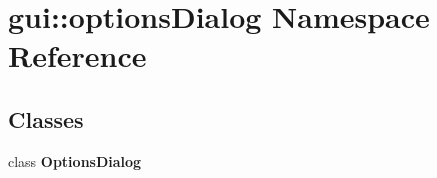 \section{gui::optionsDialog Namespace Reference}
\label{namespacegui_1_1optionsDialog}


\subsection*{Classes}
\begin{CompactItemize}
\item 
class {\bf OptionsDialog}
\end{CompactItemize}
